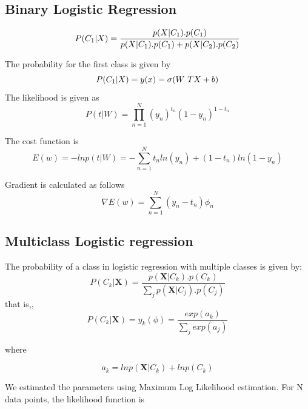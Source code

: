 \documentclass{article}
\begin{document}
\subsection{Binary Logistic Regression}
\begin{equation}
P(C_{1}|X) = \vspace{10mm}   \frac{p(X|C_{1}).p(C_{1})}{p(X|C_{1}).p(C_{1}) + p(X|C_{2}).p(C_{2})}
\end{equation}

The probability for the first class is given by 
\begin{equation}
P(C_{1}|X) = y(x)  = \sigma(W\textsuperscript{T}X + b) 
\end{equation}
The likelihood is given as 
\begin{equation}
P(t|W) = \prod\limits_{n=1}^N (y_{n})^{t_{n}}(1-y_{n})^{1- t_{n}}
\end{equation}

The cost function is 
\begin{equation}
E(w) = -ln  p(t|W) = -\sum\limits_{n=1}^N t_{n}ln(y_{n}) + (1-t_{n})ln(1-y_{n})
\end{equation}

Gradient is calculated as follows
\begin{equation}
\nabla E(w) = \sum\limits_{n=1}^N (y_{n} - t_{n}) \phi_{n}
\end{equation}



\subsection{Multiclass Logistic regression}
The probability of a class in logistic regression with multiple
classes is given by:
\begin{equation}
P(C_{k}|\boldsymbol{X}) =  \frac{p(\boldsymbol{X}|C_{k}).p(C_{k})}{\sum\limits_{j}p(\boldsymbol{X}|C_{j}).p(C_{j})}
\end{equation}
that is,,
\begin{equation}
P(C_{k}|\boldsymbol{X}) =  y_{k}(\phi) = \frac{exp(a_{k})}{\sum\limits_{j} exp(a_{j})}
\end{equation}

where 

\begin{equation}
a_{k} = ln p(\boldsymbol{X}|C_{k}) + ln  p(C_{k})
\end{equation}

We estimated the parameters using Maximum Log Likelihood
estimation. For N data points, the likelihood function is
\end{document}
